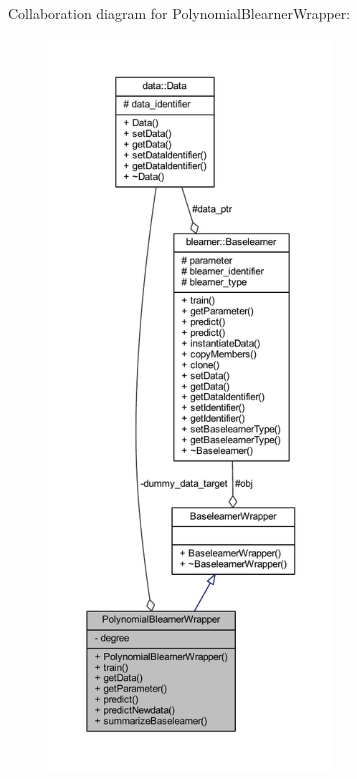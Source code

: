 Collaboration diagram for Polynomial\+Blearner\+Wrapper\+:\nopagebreak
\begin{figure}[H]
\begin{center}
\leavevmode
\includegraphics[height=550pt]{class_polynomial_blearner_wrapper__coll__graph}
\end{center}
\end{figure}
